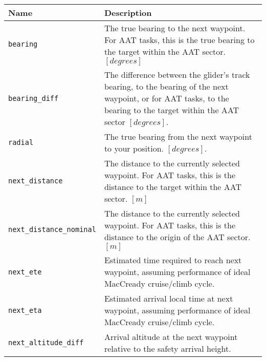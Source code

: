 \begin{maxipage}
\begin{tabularx}{1.9\textwidth}{l|X}
Name & Description \\
\hline\hline

\verb|bearing| & The true bearing to the next waypoint.
For AAT tasks, this is the true \newline bearing
to the target within the AAT sector. $[{degrees}]$\\

\hline

\verb|bearing_diff| & The difference between the glider's track bearing,
to the bearing of \newline the next waypoint, or for AAT tasks, to the bearing
to the target within \newline the AAT sector $[{degrees}]$.\\

\hline

\verb|radial| & The true bearing from the next waypoint
to your position. $[{degrees}]$. \\

\hline

\verb|next_distance| & The distance to the currently selected waypoint.
For AAT tasks, this \newline is the distance to the target within the AAT sector.
$[{m}]$ \\

\hline

\verb|next_distance_nominal| & The distance to the currently selected waypoint.
For AAT tasks, this \newline is the distance to the origin of the AAT sector.
$[{m}]$ \\

\hline

\verb|next_ete| &  Estimated time required to reach next waypoint,
assuming \newline performance of ideal MacCready cruise/climb cycle.\\

\hline

\verb|next_eta| & Estimated arrival local time at next waypoint,
assuming performance \newline of ideal MacCready cruise/climb cycle. \\

\hline

\verb|next_altitude_diff| & Arrival altitude at the next waypoint relative
to the safety arrival height. \\


\end{tabularx}
\end{maxipage}
